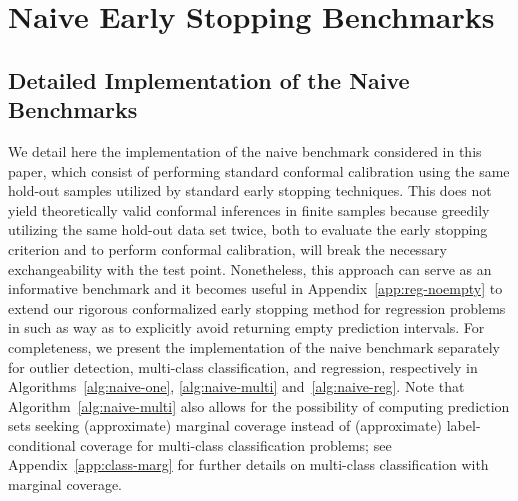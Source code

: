 \appendix
\renewcommand{\thesection}{A\arabic{section}}
\renewcommand{\theequation}{A\arabic{equation}}
\renewcommand{\thetheorem}{A\arabic{theorem}}
\renewcommand{\thecorollary}{A\arabic{corollary}}
\renewcommand{\theproposition}{A\arabic{proposition}}
\renewcommand{\thelemma}{A\arabic{lemma}}
\renewcommand{\thetable}{A\arabic{table}}
\renewcommand{\thefigure}{A\arabic{figure}}
\renewcommand{\thealgorithm}{A\arabic{algorithm}}





\section{Naive Early Stopping Benchmarks} \label{app:naive-benchmarks}

\subsection{Detailed Implementation of the Naive Benchmarks}  \label{app:naive-benchmarks-details}

We detail here the implementation of the naive benchmark considered in this paper, which consist of performing standard conformal calibration using the same hold-out samples utilized by standard early stopping techniques.
This does not yield theoretically valid conformal inferences in finite samples because greedily utilizing the same hold-out data set twice, both to evaluate the early stopping criterion and to perform conformal calibration, will break the necessary exchangeability with the test point. Nonetheless, this approach can serve as an informative benchmark and it becomes useful in Appendix~\ref{app:reg-noempty} to extend our rigorous conformalized early stopping method for regression problems in such as way as to explicitly avoid returning empty prediction intervals.
For completeness, we present the implementation of the naive benchmark separately for outlier detection, multi-class classification, and regression, respectively in Algorithms~\ref{alg:naive-one}, \ref{alg:naive-multi} and~\ref{alg:naive-reg}.
Note that Algorithm~\ref{alg:naive-multi} also allows for the possibility of computing prediction sets seeking (approximate) marginal coverage instead of (approximate) label-conditional coverage for multi-class classification problems; see Appendix~\ref{app:class-marg} for further details on multi-class classification with marginal coverage.

